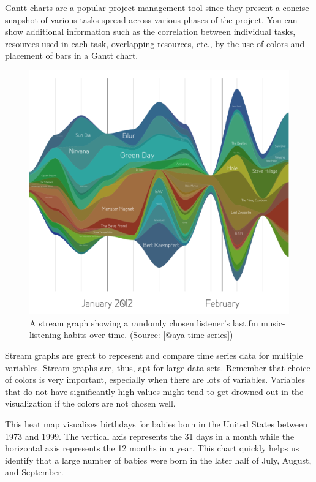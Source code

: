 \documentclass[]{book}
\theoremstyle{definition}
\theoremstyle{definition}
\theoremstyle{definition}
\theoremstyle{remark}
\begin{document}
Gantt charts are a popular project management tool since they present a
concise snapshot of various tasks spread across various phases of the
project. You can show additional information such as the correlation
between individual tasks, resources used in each task, overlapping
resources, etc., by the use of colors and placement of bars in a Gantt
chart.

\begin{figure}

{\centering \includegraphics[width=0.6\linewidth]{images/aya-stream} 

}

\caption{A stream graph showing a randomly chosen listener's last.fm music-listening habits over time. (Source: [@aya-time-series])}\label{fig:aya-stream}
\end{figure}

Stream graphs are great to represent and compare time series data for
multiple variables. Stream graphs are, thus, apt for large data sets.
Remember that choice of colors is very important, especially when there
are lots of variables. Variables that do not have significantly high
values might tend to get drowned out in the visualization if the colors
are not chosen well.

This heat map visualizes birthdays for babies born in the United States
between 1973 and 1999. The vertical axis represents the 31 days in a
month while the horizontal axis represents the 12 months in a year. This
chart quickly helps us identify that a large number of babies were born
in the later half of July, August, and September.
\end{document}
